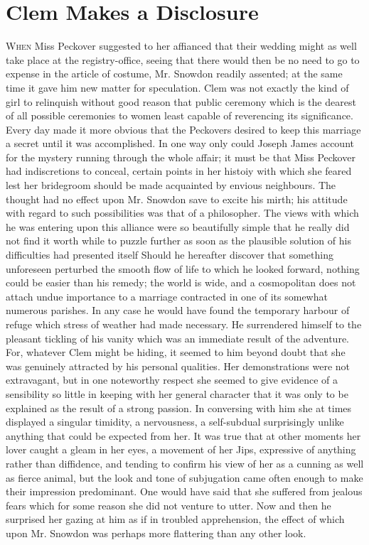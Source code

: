 \chapter{Clem Makes a Disclosure}

\textsc{When} Miss Peckover suggested to her affianced that their
wedding might as well take place at the registry-office, seeing that
there would then be no need to go to expense in the article of costume,
Mr. Snowdon readily assented; at the same time it gave him new matter
for speculation. Clem was not exactly the kind of girl to relinquish
without good reason that public ceremony which is the dearest of all
possible ceremonies to women least capable of reverencing its
significance. Every day made it more obvious that the Peckovers desired
to keep this marriage a secret until it was accomplished. In one way
only could Joseph James account for the mystery running through the
whole affair; it must be {}that Miss Peckover had indiscretions to
conceal, certain points in her histoiy with which she feared lest her
bridegroom should be made acquainted by envious neighbours. The thought
had no effect upon Mr. Snowdon save to excite his mirth; his attitude
with regard to such possibilities was that of a philosopher. The views
with which he was entering upon this alliance were so beautifully simple
that he really did not find it worth while to puzzle further as soon as
the plausible solution of his difficulties had presented itself Should
he hereafter discover that something unforeseen perturbed the smooth
flow of life to which he looked forward, nothing could be easier than
his remedy; the world is wide, and a cosmopolitan does not attach undue
importance to a marriage contracted in one of its somewhat numerous
parishes. In any case he would have found the temporary harbour of
refuge which stress of weather had made necessary. He surrendered
himself to the pleasant tickling of his vanity which was an immediate
result of the adventure. For, {}whatever Clem might be hiding, it seemed
to him beyond doubt that she was genuinely attracted by his personal
qualities. Her demonstrations were not extravagant, but in one
noteworthy respect she seemed to give evidence of a sensibility so
little in keeping with her general character that it was only to be
explained as the result of a strong passion. In conversing with him she
at times displayed a singular timidity, a nervousness, a self-subdual
surprisingly unlike anything that could be expected from her. It was
true that at other moments her lover caught a gleam in her eyes, a
movement of her Jips, expressive of anything rather than diffidence, and
tending to confirm his view of her as a cunning as well as fierce
animal, but the look and tone of subjugation came often enough to make
their impression predominant. One would have said that she suffered from
jealous fears which for some reason she did not venture to utter. Now
and then he surprised her gazing at him as if in troubled apprehension,
the effect of which {}upon Mr. Snowdon was perhaps more flattering than
any other look.

